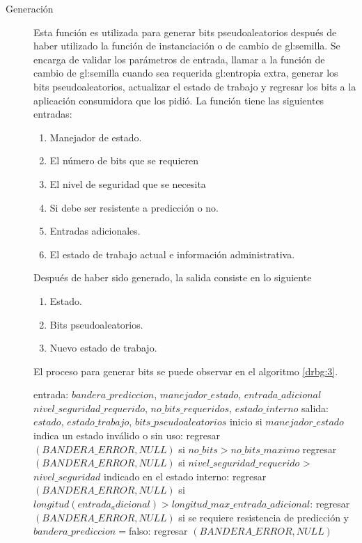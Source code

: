 \begin{description}
  \item [Generación] Esta función es utilizada para generar bits
    pseudoaleatorios después de haber utilizado la función de instanciación o 
    de cambio de \gls{gl:semilla}. Se encarga de validar los parámetros de
    entrada, llamar a la función de cambio de \gls{gl:semilla} cuando sea
    requerida \gls{gl:entropia} extra, generar los bits pseudoaleatorios,
    actualizar el estado de trabajo y regresar los bits a la aplicación
    consumidora que los pidió. La función tiene las siguientes entradas:
    \begin{enumerate}
      \item Manejador de estado. 
      \item El número de bits que se requieren
      \item El nivel de seguridad que se necesita
      \item Si debe ser resistente a predicción o no.
      \item Entradas adicionales.
      \item El estado de trabajo actual e información administrativa.
    \end{enumerate}
    Después de haber sido generado, la salida consiste en lo siguiente
    \begin{enumerate}
      \item Estado.
      \item Bits pseudoaleatorios.
      \item Nuevo estado de trabajo.
    \end{enumerate}
    El proceso para generar bits se puede observar en el algoritmo \ref{drbg:3}.
    \begin{pseudocodigo}[caption={DRBG, generación.}, label={drbg:3}]
      entrada:  $bandera\_prediccion$, $manejador\_estado$, $entrada\_adicional$
                $nivel\_seguridad\_requerido$, $no\_bits\_requeridos$, $estado\_interno$ 
      salida:   $estado$, $estado\_trabajo$, $bits\_pseudoaleatorios$
      inicio
        si $manejador\_estado$ indica un estado inválido o sin uso:
          regresar $(BANDERA\_ERROR, NULL)$
        si $no\_bits > no\_bits\_maximo$
          regresar $(BANDERA\_ERROR, NULL)$
        si $nivel\_seguridad\_requerido$ > $nivel\_seguridad$ indicado en el estado interno:
          regresar $(BANDERA\_ERROR, NULL)$
        si $longitud(entrada_adicional) > longitud\_max\_entrada\_adicional$:
          regresar $(BANDERA\_ERROR, NULL)$
        si se requiere resistencia de predicción y $bandera\_prediccion=$falso:
          regresar $(BANDERA\_ERROR, NULL)$

\end{pseudocodigo}
\end{description}

